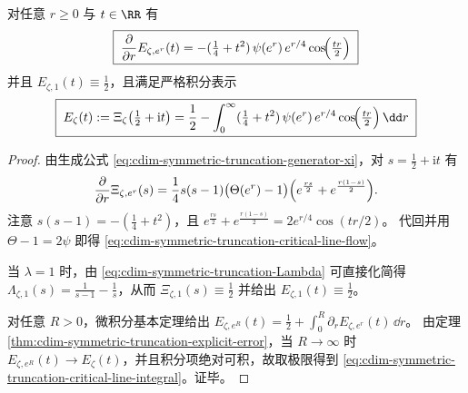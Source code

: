\begin{proposition}[临界线截断的对数尺度流与余弦驱动项]\label{prop:cdim-symmetric-truncation-critical-line-flow}
对任意 \(r\ge 0\) 与 \(t\in\RR\) 有
\begin{equation}\label{eq:cdim-symmetric-truncation-critical-line-flow}
\boxed{\;
\frac{\partial}{\partial r}E_{\zeta,e^r}(t)
=-(\tfrac14+t^2)\,\psi(e^r)\,e^{r/4}\cos\!\Bigl(\tfrac{tr}{2}\Bigr)\;}
\end{equation}
并且 \(E_{\zeta,1}(t)\equiv \tfrac12\)，且满足严格积分表示
\begin{equation}\label{eq:cdim-symmetric-truncation-critical-line-integral}
\boxed{\;
E_\zeta(t):=\Xi_\zeta\!\left(\tfrac12+\mathrm{i}t\right)
=\frac12-\int_0^\infty (\tfrac14+t^2)\,\psi(e^r)\,e^{r/4}\cos\!\Bigl(\tfrac{tr}{2}\Bigr)\,\dd r\;}
\end{equation}
\end{proposition}

\begin{proof}
由生成公式 \eqref{eq:cdim-symmetric-truncation-generator-xi}，对 \(s=\tfrac12+\mathrm{i}t\) 有
\[
\frac{\partial}{\partial r}\Xi_{\zeta,e^r}(s)
=\frac14 s(s-1)\bigl(\Theta(e^r)-1\bigr)\Bigl(e^{\frac{rs}{2}}+e^{\frac{r(1-s)}{2}}\Bigr).
\]
注意 \(s(s-1)=-(\tfrac14+t^2)\)，且
\(
e^{\frac{rs}{2}}+e^{\frac{r(1-s)}{2}}
=2e^{r/4}\cos(tr/2)
\)。
代回并用 \(\Theta-1=2\psi\) 即得 \eqref{eq:cdim-symmetric-truncation-critical-line-flow}。
\par
当 \(\lambda=1\) 时，由 \eqref{eq:cdim-symmetric-truncation-Lambda} 可直接化简得
\(\Lambda_{\zeta,1}(s)=\frac{1}{s-1}-\frac{1}{s}\)，从而 \(\Xi_{\zeta,1}(s)\equiv \tfrac12\) 并给出 \(E_{\zeta,1}(t)\equiv\tfrac12\)。
\par
对任意 \(R>0\)，微积分基本定理给出
\(
E_{\zeta,e^R}(t)=\tfrac12+\int_0^R \partial_r E_{\zeta,e^r}(t)\,\dd r
\)。
由定理 \ref{thm:cdim-symmetric-truncation-explicit-error}，当 \(R\to\infty\) 时 \(E_{\zeta,e^R}(t)\to E_\zeta(t)\)，并且积分项绝对可积，故取极限得到 \eqref{eq:cdim-symmetric-truncation-critical-line-integral}。证毕。
\end{proof}


